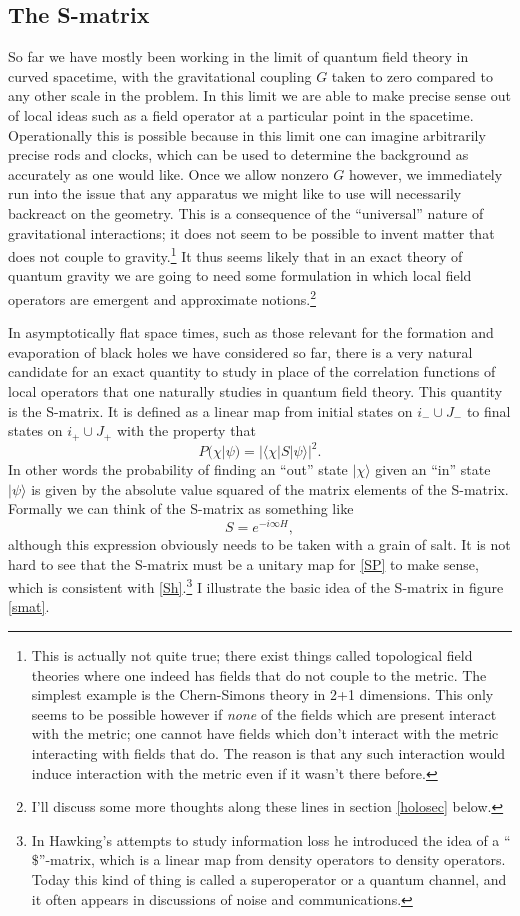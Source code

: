 \documentclass[12pt]{article}
\newcommand{\be}{\begin{equation}}
\newcommand{\ee}{\end{equation}}
\newcommand{\lan}{\langle}
\newcommand{\ran}{\rangle}
\begin{document}
\subsection{The S-matrix}\label{smatsec}
So far we have mostly been working in the limit of quantum field theory in curved spacetime, with the gravitational coupling $G$ taken to zero compared to any other scale in the problem.  In this limit we are able to make precise sense out of local ideas such as a field operator at a particular point in the spacetime.  Operationally this is possible because in this limit one can imagine arbitrarily precise rods and clocks, which can be used to determine the background as accurately as one would like.  Once we allow nonzero $G$ however, we immediately run into the issue that any apparatus we might like to use will necessarily backreact on the geometry.  This is a consequence of the ``universal'' nature of gravitational interactions; it does not seem to be possible to invent matter that does not couple to gravity.\footnote{This is actually not quite true; there exist things called topological field theories where one indeed has fields that do not couple to the metric.  The simplest example is the Chern-Simons theory in 2+1 dimensions.  This only seems to be possible however if \textit{none} of the fields which are present interact with the metric; one cannot have fields which don't interact with the metric interacting with fields that do.  The reason is that any such interaction would induce interaction with the metric even if it wasn't there before.}  It thus seems likely that in an exact theory of quantum gravity we are going to need some formulation in which local field operators are emergent and approximate notions.\footnote{I'll discuss some more thoughts along these lines in section \ref{holosec} below.}

In asymptotically flat space times, such as those relevant for the formation and evaporation of black holes we have considered so far, there is a very natural candidate for an exact quantity to study in place of the correlation functions of local operators that one naturally studies in quantum field theory.  This quantity is the S-matrix.  It is defined as a linear map from initial states on $i_-\cup J_-$ to final states on $i_+\cup J_+$ with the property that
\be\label{SP}
P(\chi|\psi)=|\lan\chi|S|\psi\ran|^2.
\ee
In other words the probability of finding an ``out'' state $|\chi\ran$ given an ``in'' state $|\psi\ran$ is given by the absolute value squared of the matrix elements of the S-matrix.  Formally we can think of the S-matrix as something like
\be\label{Sh}
S = e^{-i\infty H},
\ee
although this expression obviously needs to be taken with a grain of salt.  It is not hard to see that the S-matrix must be a unitary map for \eqref{SP} to make sense, which is consistent with \eqref{Sh}.\footnote{In Hawking's attempts to study information loss he introduced the idea of a ``$\$$''-matrix, which is a linear map from density operators to density operators.  Today this kind of thing is called a superoperator or a quantum channel, and it often appears in discussions of noise and communications.}  I illustrate the basic idea of the S-matrix in figure \ref{smat}.
\end{document}
